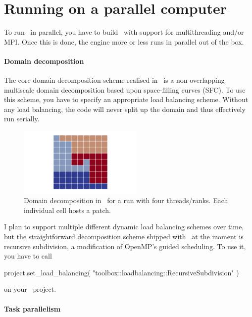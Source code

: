 \section{Running on a parallel computer}

To run \ExaHyPE\ in parallel, you have to build \Peano\ with support for
multithreading and/or MPI.
Once this is done, the engine more or less runs in parallel out of the box.


\paragraph{Domain decomposition}
The core domain decomposition scheme realised in \ExaHyPE\ is a non-overlapping
multiscale domain decomposition based upon space-filling curves (SFC).
To use this scheme, you have to specify an appropriate load balancing scheme.
Without any load balancing, the code will never split up the domain and thus
effectively run serially.

\begin{figure}
 \begin{center}
  \includegraphics[width=0.54\textwidth]{60_exahype/domain-decomposition.png}
 \end{center}
 \caption{
  Domain decomposition in \ExaHyPE\ for a run with four threads/ranks. Each
  individual cell hosts a patch.
 }
\end{figure}


I plan to support multiple different dynamic load balancing schemes over time,
but the straightforward decomposition scheme shipped with \Peano\ at the moment
is recursive subdivision, a modification of OpenMP's guided scheduling.
To use it, you have to call
\begin{code}
project.set_load_balancing( "toolbox::loadbalancing::RecursiveSubdivision" )
\end{code}

\noindent
on your \ExaHyPE\ project. 


\paragraph{Task parallelism}

